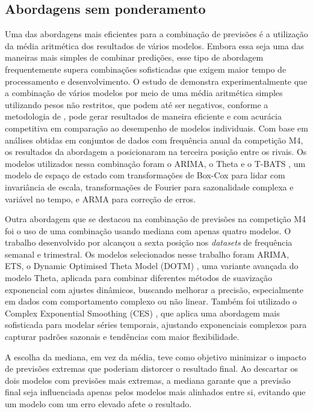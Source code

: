\subsection{Abordagens sem ponderamento}
\label{subsec:sem_ponderamento}
Uma das abordagens mais eficientes para a combinação de previsões é a utilização da média aritmética dos resultados de vários modelos. Embora essa seja uma das maneiras mais simples de combinar predições, esse tipo de abordagem frequentemente supera combinações sofisticadas que exigem maior tempo de processamento e desenvolvimento. O estudo de \cite{shaub2020} demonstra experimentalmente que a combinação de vários modelos por meio de uma média aritmética simples utilizando pesos não restritos, que podem até ser negativos, conforme a metodologia de \cite{granger1984}, pode gerar resultados de maneira eficiente e com acurácia competitiva em comparação ao desempenho de modelos individuais. Com base em análises obtidas em conjuntos de dados com frequência anual da competição M4, os resultados da abordagem a posicionaram na terceira posição entre os rivais. Os modelos utilizados nessa combinação foram o ARIMA, o Theta \citep{assimakopoulos2000theta} e o T-BATS \citep{tbats2011}, um modelo de espaço de estado com transformações de Box-Cox para lidar com invariância de escala, transformações de Fourier para sazonalidade complexa e variável no tempo, e ARMA para correção de erros.

Outra abordagem que se destacou na combinação de previsões na competição M4 foi o uso de uma combinação usando mediana com apenas quatro modelos. O trabalho desenvolvido por \cite{petropoulos2020} alcançou a sexta posição nos \textit{datasets} de frequência semanal e trimestral. Os modelos selecionados nesse trabalho foram 
ARIMA, ETS, o Dynamic Optimised Theta Model (DOTM) \citep{dotm2016}, uma variante avançada do modelo Theta, aplicada para combinar diferentes métodos de suavização exponencial com ajustes dinâmicos, buscando melhorar a precisão, especialmente em dados com comportamento complexo ou não linear. Também foi utilizado o Complex Exponential Smoothing (CES) \citep{ces2018}, que aplica uma abordagem mais sofisticada para modelar séries temporais, ajustando exponenciais complexos para capturar padrões sazonais e tendências com maior flexibilidade.

A escolha da mediana, em vez da média, teve como objetivo minimizar o impacto de previsões extremas que poderiam distorcer o resultado final. Ao descartar os dois modelos com previsões mais extremas, a mediana garante que a previsão final seja influenciada apenas pelos modelos mais alinhados entre si, evitando que um modelo com um erro elevado afete o resultado. %

